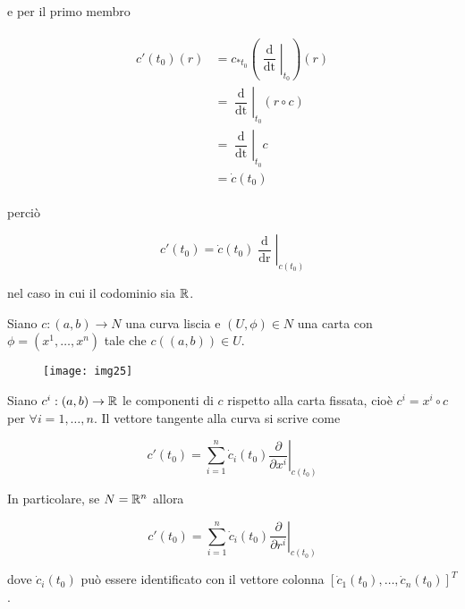 e per il primo membro

\begin{align}
	\begin{split}
		c'(t_{0})(r) &= c_{*t_{0}} \left( \left. \dfrac{\operatorname{d}}{\operatorname{dt}} \right|_{t_{0}} \right)(r)\\
		&= \left. \dfrac{\operatorname{d}}{\operatorname{dt}} \right|_{t_{0}} (r \circ c)\\
		&= \left. \dfrac{\operatorname{d}}{\operatorname{dt}} \right|_{t_{0}} c\\
		&= \dot{c}(t_{0})
	\end{split}
\end{align}

perciò

\begin{equation}
	c'(t_{0}) = \dot{c}(t_{0}) \left. \dfrac{\operatorname{d}}{\operatorname{dr}} \right|_{c(t_{0})}
\end{equation}

nel caso in cui il codominio sia $ \mathbb{R} $.

\begin{definition}\label{loc-exp-tan-cur}
	Siano $ c : (a,b) \to N $ una curva liscia e $ (U,\phi) \in N $ una carta con $ \phi = (x^{1},\dots,x^{n}) $ tale che $ c((a,b)) \in U $.
	
	\begin{figure}[H]
		\centering
		\texttt{[image: img25]}
	\end{figure}
	
	Siano $ c^{i} : (a,b) \to \mathbb{R} $ le componenti di $ c $ rispetto alla carta fissata, cioè $ c^{i} = x^{i} \circ c $ per $ \forall i=1,\dots,n $. Il vettore tangente alla curva si scrive come
	
	\begin{equation}
		c'(t_{0}) = \sum_{i=1}^{n} \dot{c}_{i}(t_{0}) \left. \dfrac{\partial}{\partial x^{i}} \right|_{c(t_{0})}
	\end{equation}

	In particolare, se $ N = \mathbb{R}^{n} $ allora
	
	\begin{equation}
		c'(t_{0}) = \sum_{i=1}^{n} \dot{c}_{i}(t_{0}) \left. \dfrac{\partial}{\partial r^{i}} \right|_{c(t_{0})}
	\end{equation}

	dove $ \dot{c}_{i}(t_{0}) $ può essere identificato con il vettore colonna $ [\dot{c}_{1}(t_{0}),\dots,\dot{c}_{n}(t_{0})]^{T} $.
\end{definition}

